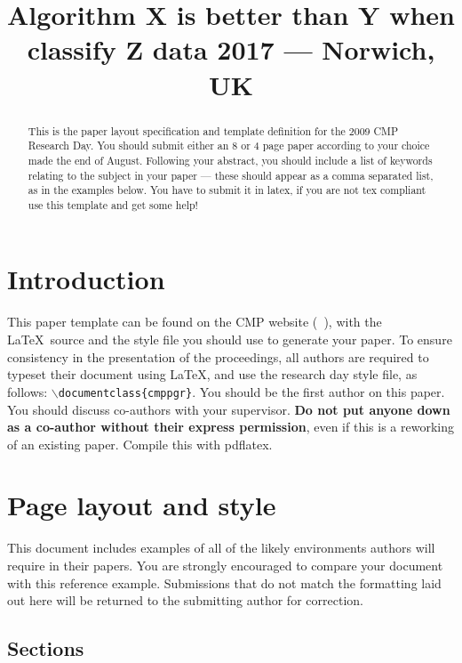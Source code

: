 \documentclass{cmppgr}
\title{Algorithm X is better than Y when classify Z data 2017 --- Norwich, UK}
\begin{document}
\maketitle

\begin{abstract}

This is the paper layout specification and template definition for the 2009 CMP Research Day. You should submit either an 8 or 4 page paper according to your choice made the end of August. Following your abstract, you should include a list of keywords relating to the subject in your paper --- these should appear as a comma separated list, as in the examples below. You have to submit it in latex, if you are not tex compliant use this template and get some help!

\end{abstract}


\section{Introduction}

This paper template can be found on the CMP website (\texttt{  }), with  the \LaTeX\ source and the style file you should use to generate your paper. To ensure consistency in the presentation of the proceedings, all authors are required to typeset their document using \LaTeX, and use the research day style file, as follows: \texttt{$\backslash$documentclass\{cmppgr\}}. You should be the first author on this paper. You should discuss co-authors with your supervisor. {\bf Do not put anyone down as a co-author without their express permission}, even if this is a reworking of an existing paper. Compile this with pdflatex.

\section{Page layout and style}

This document includes examples of all of the likely environments authors will require in their papers. You are strongly encouraged to compare your document with this reference example. Submissions that do not match the formatting laid out here will be returned to the submitting author for correction.

\subsection{Sections}
\end{document}

